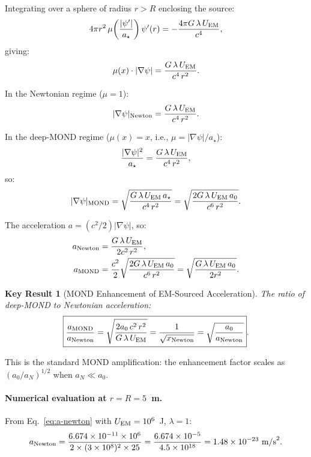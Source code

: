 \documentclass[aps,prd,twocolumn,superscriptaddress,nofootinbib]{revtex4-2}
\newcommand{\astar}{a_\star}
\newcommand{\ee}[1]{\times 10^{#1}}
\newcommand{\lam}{\lambda}
\newtheorem{result}{Key Result}
\begin{document}
Integrating over a sphere of radius $r > R$ enclosing the source:
\begin{equation}
4\pi r^2\,\mu\!\left(\frac{|\psi'|}{\astar}\right)\psi'(r)
= -\frac{4\pi G\,\lam\,U_{\rm EM}}{c^4},
\end{equation}
giving:
\begin{equation}\label{eq:mu-constraint}
\mu(x)\cdot|\nabla\psi| = \frac{G\,\lam\,U_{\rm EM}}{c^4\,r^2}.
\end{equation}

In the Newtonian regime ($\mu = 1$):
\begin{equation}
|\nabla\psi|_{\rm Newton} = \frac{G\,\lam\,U_{\rm EM}}{c^4\,r^2}.
\end{equation}

In the deep-MOND regime ($\mu(x) = x$, i.e., $\mu = |\nabla\psi|/\astar$):
\begin{equation}
\frac{|\nabla\psi|^2}{\astar} = \frac{G\,\lam\,U_{\rm EM}}{c^4\,r^2},
\end{equation}
so:
\begin{equation}\label{eq:deep-mond-gradient}
|\nabla\psi|_{\rm MOND} = \sqrt{\frac{G\,\lam\,U_{\rm EM}\,\astar}{c^4\,r^2}}
= \sqrt{\frac{2G\,\lam\,U_{\rm EM}\,a_0}{c^6\,r^2}}.
\end{equation}

The acceleration $a = (c^2/2)|\nabla\psi|$, so:
\begin{align}
a_{\rm Newton} &= \frac{G\,\lam\,U_{\rm EM}}{2c^2\,r^2}, \label{eq:a-newton}\\
a_{\rm MOND} &= \frac{c^2}{2}\sqrt{\frac{2G\,\lam\,U_{\rm EM}\,a_0}{c^6\,r^2}}
= \sqrt{\frac{G\,\lam\,U_{\rm EM}\,a_0}{2r^2}}. \label{eq:a-mond}
\end{align}

\begin{result}[MOND Enhancement of EM-Sourced Acceleration]
The ratio of deep-MOND to Newtonian acceleration:
\begin{equation}\label{eq:enhancement-ratio}
\boxed{\frac{a_{\rm MOND}}{a_{\rm Newton}}
= \sqrt{\frac{2a_0\,c^2\,r^2}{G\,\lam\,U_{\rm EM}}}
= \frac{1}{\sqrt{x_{\rm Newton}}}
= \sqrt{\frac{a_0}{a_{\rm Newton}}}}.
\end{equation}
\end{result}

This is the standard MOND amplification: the enhancement factor scales
as $(a_0/a_N)^{1/2}$ when $a_N \ll a_0$.

\paragraph{Numerical evaluation at $r = R = 5$~m.}
From Eq.~\eqref{eq:a-newton} with $U_{\rm EM} = 10^6$~J, $\lam = 1$:
\begin{equation}
a_{\rm Newton} = \frac{6.674\ee{-11}\times 10^6}{2\times(3\ee{8})^2\times 25}
= \frac{6.674\ee{-5}}{4.5\ee{18}} = 1.48\ee{-23}~\text{m/s}^2.
\end{equation}
\end{document}
